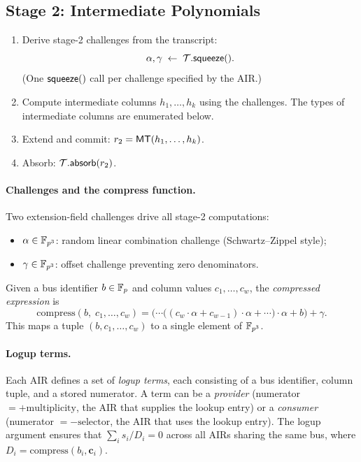 \subsection{Stage 2: Intermediate Polynomials}
\label{sec:stage2}

\begin{enumerate}[label=(\roman*)]
  \item Derive stage-2 challenges from the transcript:
        \[
          \alpha, \gamma \;\leftarrow\; \mathcal{T}.\textsf{squeeze}().
        \]
        (One $\textsf{squeeze}()$ call per challenge specified by the AIR.)

  \item Compute intermediate columns $h_1, \ldots, h_k$ using the challenges.
        The types of intermediate columns are enumerated below.

  \item Extend and commit:
        $r_2 = \textsf{MT}(h_1, \ldots, h_k)$.

  \item Absorb: $\mathcal{T}.\textsf{absorb}(r_2)$.
\end{enumerate}

\paragraph{Challenges and the compress function.}
Two extension-field challenges drive all stage-2 computations:
\begin{itemize}[nosep]
  \item $\alpha \in \mathbb{F}_{p^3}$: random linear combination challenge
        (Schwartz--Zippel style);
  \item $\gamma \in \mathbb{F}_{p^3}$: offset challenge preventing zero denominators.
\end{itemize}
Given a bus identifier $b \in \mathbb{F}_p$ and column values $c_1, \ldots, c_w$,
the \emph{compressed expression} is
\begin{equation}
  \label{eq:compress}
  \mathrm{compress}(b,\; c_1, \ldots, c_w)
  = \bigl(\cdots\bigl((c_w \cdot \alpha + c_{w-1}) \cdot \alpha + \cdots\bigr)
    \cdot \alpha + b\bigr) + \gamma.
\end{equation}
This maps a tuple $(b, c_1, \ldots, c_w)$ to a single element of $\mathbb{F}_{p^3}$.

\paragraph{Logup terms.}
Each AIR defines a set of \emph{logup terms}, each consisting of a bus
identifier, column tuple, and a stored numerator.
A term can be a \emph{provider} (numerator $= +\mathrm{multiplicity}$,
the AIR that supplies the lookup entry) or
a \emph{consumer} (numerator $= -\mathrm{selector}$,
the AIR that uses the lookup entry).
The logup argument ensures that $\sum_i s_i / D_i = 0$ across all AIRs
sharing the same bus, where $D_i = \mathrm{compress}(b_i, \mathbf{c}_i)$.

